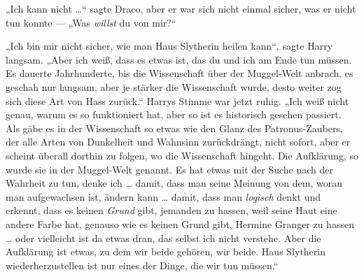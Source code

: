 „Ich kann nicht …“ sagte Draco, aber er war sich nicht einmal sicher, was er nicht tun konnte —
„Was \emph{willst} du von mir?“

„Ich bin mir nicht sicher, wie man Haus Slytherin heilen kann“, sagte Harry langsam.
„Aber ich weiß, dass es etwas ist, das du und ich am Ende tun müssen. Es dauerte Jahrhunderte, bis die Wissenschaft über der Muggel-Welt anbrach, es geschah nur langsam, aber je stärker die Wissenschaft wurde, desto weiter zog sich diese Art von Hass zurück.“ Harrys Stimme war jetzt ruhig.
„Ich weiß nicht genau, warum es so funktioniert hat, aber so ist es historisch gesehen passiert. Als gäbe es in der Wissenschaft so etwas wie den Glanz des Patronus-Zaubers, der alle Arten von Dunkelheit und Wahnsinn zurückdrängt, nicht sofort, aber er scheint überall dorthin zu folgen, wo die Wissenschaft hingeht. Die Aufklärung, so wurde sie in der Muggel-Welt genannt.%
Es hat etwas mit der Suche nach der Wahrheit zu tun, denke ich … damit, dass man seine Meinung von dem, woran man aufgewachsen ist, ändern kann … damit, dass man \emph{logisch} denkt und erkennt, dass es keinen \emph{Grund} gibt, jemanden zu hassen, weil seine Haut eine andere Farbe hat, genauso wie es keinen Grund gibt, Hermine Granger zu hassen … oder vielleicht ist da etwas dran, das selbst ich nicht verstehe. Aber die Aufklärung ist etwas, zu dem wir beide gehören, wir beide. Haus Slytherin wiederherzustellen ist nur eines der Dinge, die wir tun müssen.“

